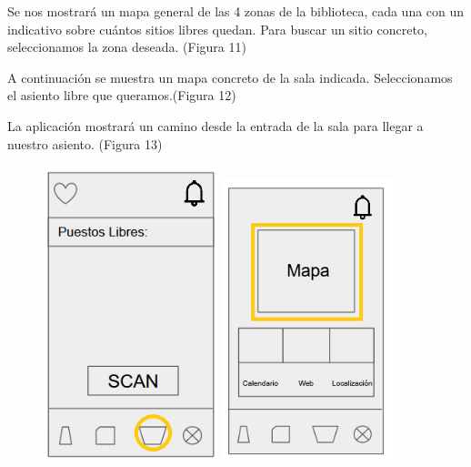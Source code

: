 \documentclass[12pt]{article}
\begin{document}
Se nos mostrará un mapa general de las 4 zonas de la biblioteca, cada una con un indicativo sobre cuántos sitios libres quedan. Para buscar un sitio concreto, seleccionamos la zona deseada. (Figura 11)

A continuación se muestra un mapa concreto de la sala indicada. Seleccionamos el asiento libre que queramos.(Figura 12) 

La aplicación mostrará un camino desde la entrada de la sala para llegar a nuestro asiento. (Figura 13)\\

\begin{figure}
\centering
{}
	\includegraphics[width=0.45\textwidth]{mapa.png} 
\endminipage
{}
	\includegraphics[width=0.45\textwidth]{mapa1.png} 
\endminipage


\end{figure}
\end{document}
